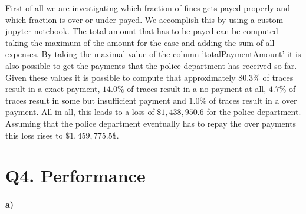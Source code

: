 \documentclass[12pt]{report}
\begin{document}
First of all we are investigating which fraction of fines gets payed properly and which fraction is over or under payed. We accomplish this by using a custom jupyter notebook. The total amount that has to be payed can be computed taking the maximum of the amount for the case and adding the sum of all expenses. By taking the maximal value of the column 'totalPaymentAmount' it is also possible to get the payments that the police department has received so far. Given these values it is possible to compute that approximately $80.3\%$ of traces result in a exact payment, $14.0\%$ of traces result in a no payment at all, $4.7\%$ of traces result in some but insufficient payment and $1.0\%$ of traces result in a over payment. All in all, this leads to a loss of $ \$ 1,438,950.6$ for the police department. Assuming that the police department eventually has to repay the over payments this loss rises to $ \$ 1,459,775.5 \$ $.

\section{Q4. Performance}

\paragraph{\textbf{a)}}
\end{document}
